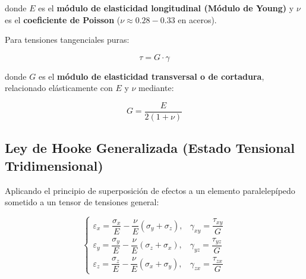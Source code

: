 donde $E$ es el \textbf{módulo de elasticidad longitudinal (Módulo de Young)} y $\nu$ es el \textbf{coeficiente de Poisson} ($\nu \approx 0.28 - 0.33$ en aceros).



Para tensiones tangenciales puras:

\begin{equation}

    \tau = G \cdot \gamma

\end{equation}

donde $G$ es el \textbf{módulo de elasticidad transversal o de cortadura}, relacionado elásticamente con $E$ y $\nu$ mediante:

\begin{equation}

    G = \frac{E}{2(1 + \nu)}

    \label{eq:modulo_cizalladura_G}

\end{equation}



\subsection{Ley de Hooke Generalizada (Estado Tensional Tridimensional)}

Aplicando el principio de superposición de efectos a un elemento paralelepípedo sometido a un tensor de tensiones general:

\begin{equation}

    \begin{cases}

        \varepsilon_x = \dfrac{\sigma_x}{E} - \dfrac{\nu}{E}(\sigma_y + \sigma_z), & \gamma_{xy} = \dfrac{\tau_{xy}}{G} \\[10pt]

        \varepsilon_y = \dfrac{\sigma_y}{E} - \dfrac{\nu}{E}(\sigma_z + \sigma_x), & \gamma_{yz} = \dfrac{\tau_{yz}}{G} \\[10pt]

        \varepsilon_z = \dfrac{\sigma_z}{E} - \dfrac{\nu}{E}(\sigma_x + \sigma_y), & \gamma_{zx} = \dfrac{\tau_{zx}}{G}

    \end{cases}

    \label{eq:hooke_generalizada}

\end{equation}



